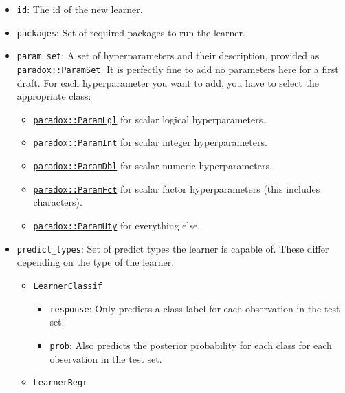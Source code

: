 \documentclass[]{scrbook}
\providecommand{\tightlist}{%
  \setlength{\itemsep}{0pt}\setlength{\parskip}{0pt}}
\begin{document}
\begin{itemize}
\tightlist
\item
  \texttt{id}: The id of the new learner.
\item
  \texttt{packages}: Set of required packages to run the learner.
\item
  \texttt{param\_set}: A set of hyperparameters and their description, provided as \href{https://paradox.mlr-org.com/reference/ParamSet.html}{\texttt{paradox::ParamSet}}.
  It is perfectly fine to add no parameters here for a first draft.
  For each hyperparameter you want to add, you have to select the appropriate class:

  \begin{itemize}
  \tightlist
  \item
    \href{https://paradox.mlr-org.com/reference/ParamLgl.html}{\texttt{paradox::ParamLgl}} for scalar logical hyperparameters.
  \item
    \href{https://paradox.mlr-org.com/reference/ParamInt.html}{\texttt{paradox::ParamInt}} for scalar integer hyperparameters.
  \item
    \href{https://paradox.mlr-org.com/reference/ParamDbl.html}{\texttt{paradox::ParamDbl}} for scalar numeric hyperparameters.
  \item
    \href{https://paradox.mlr-org.com/reference/ParamFct.html}{\texttt{paradox::ParamFct}} for scalar factor hyperparameters (this includes characters).
  \item
    \href{https://paradox.mlr-org.com/reference/ParamUty.html}{\texttt{paradox::ParamUty}} for everything else.
  \end{itemize}
\item
  \texttt{predict\_types}: Set of predict types the learner is capable of.
  These differ depending on the type of the learner.

  \begin{itemize}
  \tightlist
  \item
    \texttt{LearnerClassif}

    \begin{itemize}
    \tightlist
    \item
      \texttt{response}: Only predicts a class label for each observation in the test set.
    \item
      \texttt{prob}: Also predicts the posterior probability for each class for each observation in the test set.
    \end{itemize}
  \item
    \texttt{LearnerRegr}


\end{itemize}
\end{itemize}
\end{document}
